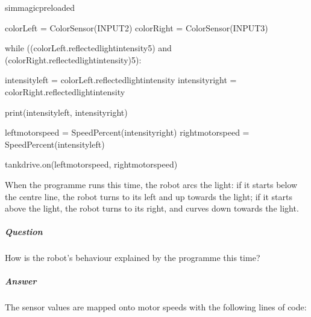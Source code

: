 \documentclass[letterpaper,10pt,english]{sphinxmanual}
\begin{document}
{
\begin{sphinxVerbatim}[commandchars=\\\{\}]
\llap{\color{nbsphinxin}[ ]:\,\hspace{\fboxrule}\hspace{\fboxsep}}\PYGZpc{}\PYGZpc{}sim\PYGZus{}magic\PYGZus{}preloaded

colorLeft = ColorSensor(INPUT\PYGZus{}2)
colorRight = ColorSensor(INPUT\PYGZus{}3)

while ((colorLeft.reflected\PYGZus{}light\PYGZus{}intensity\PYGZgt{}5)
       and (colorRight.reflected\PYGZus{}light\PYGZus{}intensity)\PYGZgt{}5):

    intensity\PYGZus{}left = colorLeft.reflected\PYGZus{}light\PYGZus{}intensity
    intensity\PYGZus{}right = colorRight.reflected\PYGZus{}light\PYGZus{}intensity

    print(intensity\PYGZus{}left, intensity\PYGZus{}right)

    left\PYGZus{}motor\PYGZus{}speed = SpeedPercent(intensity\PYGZus{}right)
    right\PYGZus{}motor\PYGZus{}speed = SpeedPercent(intensity\PYGZus{}left)

    tank\PYGZus{}drive.on(left\PYGZus{}motor\PYGZus{}speed, right\PYGZus{}motor\PYGZus{}speed)
\end{sphinxVerbatim}
}

When the programme runs this time, the robot arcs  the light: if it starts below the centre line, the robot turns to its left and up towards the light; if it starts above the light, the robot turns to its right, and curves down towards the light.


\subparagraph{Question}
\label{\detokenize{content/03_Robot_Lab/Section_00_03:Question}}
How is the robot’s behaviour explained by the programme this time?



\subparagraph{Answer}
\label{\detokenize{content/03_Robot_Lab/Section_00_03:Answer}}

The sensor values are mapped onto motor speeds with the following lines of code:

\begin{sphinxVerbatim}[commandchars=\\\{\}]
  
  

 
\end{sphinxVerbatim}
\end{document}
